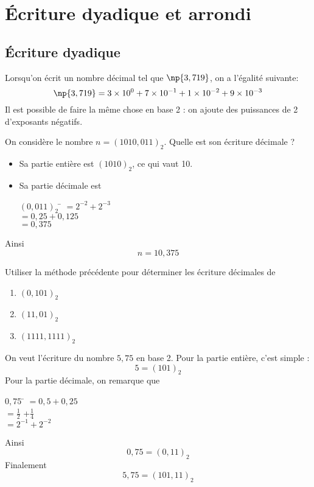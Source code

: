 \section{\'Ecriture dyadique et arrondi}

\subsection{\'Ecriture dyadique}
Lorsqu'on écrit un nombre décimal tel que $\np{3,719}$, on a l'égalité suivante:
$$\np{3,719}=3\times 10^0+7\times 10^{-1}+1\times 10^{-2}+9\times 10^{-3}$$
Il est possible de faire la même chose en base 2 : on ajoute des puissances de 2 d'exposants négatifs.

\begin{methode}
	On considère le nombre $n=(1010,011)_2$. Quelle est son écriture décimale ?
	\begin{itemize}
		\item 	Sa partie entière est $(1010)_2$, ce qui vaut 10.
		\item 	Sa partie décimale est
		      \begin{tabbing}
			      $(0,011)_2$ \= $=2^{-2}+2^{-3}$\\
			      \>  $=0,25+0,125$\\
			      \>	$=0,375$
		      \end{tabbing}
	\end{itemize}
	Ainsi $$n=10,375$$
\end{methode}
\begin{exercice}[]
	Utiliser la méthode précédente pour déterminer les écriture décimales de
	\begin{enumerate}
		\item 	$(0,101)_2$
		\item 	$(11,01)_2$
		\item 	$(1111,1111)_2$
	\end{enumerate}
\end{exercice}

\begin{methode}
	On veut l'écriture du nombre $5,75$ en base 2. Pour la partie entière, c'est simple : $$5=(101)_2$$
	Pour la partie décimale, on remarque que
	\begin{tabbing}
		$0,75$ \= $=0,5+0,25$\\
		\> 	$=\frac{1}{2}$ +$\frac{1}{4}$\\
		\>	$=2^{-1}+2^{-2}$\\
	\end{tabbing}
	Ainsi $$0,75 = (0,11)_2$$
	Finalement $$5,75=(101,11)_2$$
\end{methode}

